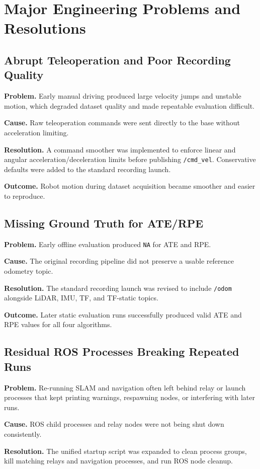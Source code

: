 \documentclass[12pt,a4paper]{report}
\begin{document}
\chapter{Major Engineering Problems and Resolutions}

\section{Abrupt Teleoperation and Poor Recording Quality}
\textbf{Problem.} Early manual driving produced large velocity jumps and unstable motion, which degraded dataset quality and made repeatable evaluation difficult.

\textbf{Cause.} Raw teleoperation commands were sent directly to the base without acceleration limiting.

\textbf{Resolution.} A command smoother was implemented to enforce linear and angular acceleration/deceleration limits before publishing \texttt{/cmd\_vel}. Conservative defaults were added to the standard recording launch.

\textbf{Outcome.} Robot motion during dataset acquisition became smoother and easier to reproduce.

\section{Missing Ground Truth for ATE/RPE}
\textbf{Problem.} Early offline evaluation produced \texttt{NA} for ATE and RPE.

\textbf{Cause.} The original recording pipeline did not preserve a usable reference odometry topic.

\textbf{Resolution.} The standard recording launch was revised to include \texttt{/odom} alongside LiDAR, IMU, TF, and TF-static topics.

\textbf{Outcome.} Later static evaluation runs successfully produced valid ATE and RPE values for all four algorithms.

\section{Residual ROS Processes Breaking Repeated Runs}
\textbf{Problem.} Re-running SLAM and navigation often left behind relay or launch processes that kept printing warnings, respawning nodes, or interfering with later runs.

\textbf{Cause.} ROS child processes and relay nodes were not being shut down consistently.

\textbf{Resolution.} The unified startup script was expanded to clean process groups, kill matching relays and navigation processes, and run ROS node cleanup.
\end{document}

